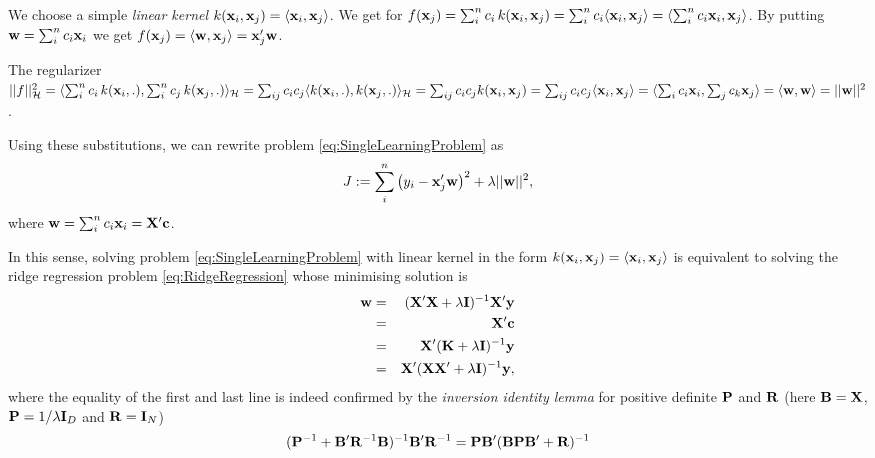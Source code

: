 We choose a simple \emph{linear kernel} $k(\mathbf{x}_i,\mathbf{x}_j) = \langle \mathbf{x}_i,
\mathbf{x}_j \rangle$.
We get for $f(\mathbf{x}_j) = \sum_i^n c_i \, k(\mathbf{x}_i,\mathbf{x}_j) = \sum_i^n c_i
\langle \mathbf{x}_i, \mathbf{x}_j \rangle = \langle \sum_i^n c_i \mathbf{x}_i, \mathbf{x}_j
\rangle$.
By putting $\mathbf{w} = \sum_i^n c_i \mathbf{x}_i$ we get $f(\mathbf{x}_j) = \langle
\mathbf{w}, \mathbf{x}_j \rangle = \mathbf{x}'_j \mathbf{w}$.

The regularizer $||f||_\mathcal{H}^2 = \langle \sum_i^n c_i \, k(\mathbf{x}_i,.),
\sum_i^n c_j \, k(\mathbf{x}_j,.) \rangle_\mathcal{H} = 
\sum_{ij} c_i c_j \langle k(\mathbf{x}_i,.), k(\mathbf{x}_j,.) \rangle_\mathcal{H} =
\sum_{ij} c_i c_j k(\mathbf{x}_i,\mathbf{x}_j) = \sum_{ij} c_i c_j \langle
\mathbf{x}_i,\mathbf{x}_j \rangle = 
\langle \sum_{i} c_i \mathbf{x}_i, \sum_{j} c_k \mathbf{x}_j \rangle = \langle \mathbf{w},
\mathbf{w} \rangle = ||\mathbf{w}||^2$.

Using these substitutions, we can rewrite problem \eqref{eq:SingleLearningProblem} as
\begin{equation}\label{eq:RidgeRegression}
 J:= \sum_i^n \big( y_i - \mathbf{x}'_j \mathbf{w} \big)^2 + \lambda ||\mathbf{w}||^2,
\end{equation}
where $\mathbf{w} = \sum_i^n c_i \mathbf{x}_i = \mathbf{X}' \mathbf{c}$.

In this sense, solving problem \eqref{eq:SingleLearningProblem} with linear kernel in the
form $k(\mathbf{x}_i,\mathbf{x}_j) = \langle \mathbf{x}_i, \mathbf{x}_j \rangle$ is equivalent
to solving the ridge regression problem \eqref{eq:RidgeRegression} whose
minimising solution is
\begin{eqnarray}\label{eq:RidgeEquivalence}
 \mathbf{w} & = & (\mathbf{X}'\mathbf{X} + \lambda \mathbf{I})^{-1} \mathbf{X}' \mathbf{y} \nonumber \\
& = & \mathbf{X}' \mathbf{c} \nonumber \\
& = & \mathbf{X}' (\mathbf{K} + \lambda \mathbf{I})^{-1} \mathbf{y} \nonumber \\
& = & \mathbf{X}' (\mathbf{X} \mathbf{X}' + \lambda \mathbf{I})^{-1} \mathbf{y},
\end{eqnarray}
where the equality of the first and last line is indeed confirmed by the
\emph{inversion identity lemma} for positive definite $\mathbf{P}$ and $\mathbf{R}$ (here $\mathbf{B} =
\mathbf{X}$, $\mathbf{P} = 1/\lambda \mathbf{I}_D$ and $\mathbf{R} = \mathbf{I}_N$)
\begin{equation}\label{eq:MatrixInversion}
 (\mathbf{P}^{-1} + \mathbf{B}' \mathbf{R}^{-1} \mathbf{B} )^{-1} \mathbf{B}' \mathbf{R}^{-1} =
\mathbf{P} \mathbf{B}' (\mathbf{B} \mathbf{P} \mathbf{B}' + \mathbf{R})^{-1}
\end{equation}


